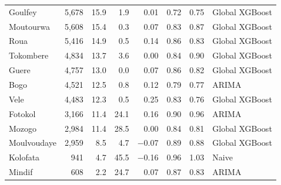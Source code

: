 \begin{table}[!htbp]
{\begin{tabular}{@{}lrrrrrrl@{}}
Goulfey & 5,678 & 15.9 & 1.9 & 0.01 & 0.72 & 0.75 & Global XGBoost \\
Moutourwa & 5,608 & 15.4 & 0.3 & 0.07 & 0.83 & 0.87 & Global XGBoost \\
Roua & 5,416 & 14.9 & 0.5 & 0.14 & 0.86 & 0.83 & Global XGBoost \\
Tokombere & 4,834 & 13.7 & 3.6 & 0.00 & 0.84 & 0.90 & Global XGBoost \\
Guere & 4,757 & 13.0 & 0.0 & 0.07 & 0.86 & 0.82 & Global XGBoost \\
Bogo & 4,521 & 12.5 & 0.8 & 0.12 & 0.79 & 0.77 & ARIMA \\
Vele & 4,483 & 12.3 & 0.5 & 0.25 & 0.83 & 0.76 & Global XGBoost \\
Fotokol & 3,166 & 11.4 & 24.1 & 0.16 & 0.90 & 0.96 & ARIMA \\
Mozogo & 2,984 & 11.4 & 28.5 & 0.00 & 0.84 & 0.81 & Global XGBoost \\
Moulvoudaye & 2,959 & 8.5 & 4.7 & $-$0.07 & 0.89 & 0.88 & Global XGBoost \\
Kolofata & 941 & 4.7 & 45.5 & $-$0.16 & 0.96 & 1.03 & Naive \\
Mindif & 608 & 2.2 & 24.7 & 0.07 & 0.87 & 0.83 & ARIMA \\
\bottomrule\end{tabular}}
\end{table}
